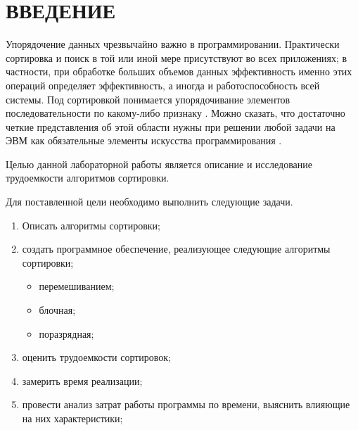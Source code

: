 \chapter*{\hfill{\centering  ВВЕДЕНИЕ}\hfill}


Упорядочение данных чрезвычайно важно в программировании. Практически сортировка и поиск в той или иной
мере присутствуют во всех приложениях; в частности, при обработке больших объемов данных эффективность именно этих операций определяет эффективность, а иногда и работоспособность всей системы.
Под сортировкой понимается упорядочивание элементов последовательности по какому-либо признаку \cite{book_shagbazyan}.
Можно сказать, что достаточно четкие представления об этой области нужны при решении любой задачи на ЭВМ как
обязательные элементы искусства программирования \cite{book_knut}.


Целью данной лабораторной работы является описание и исследование трудоемкости алгоритмов сортировки.

\label{sec:targets}
Для поставленной цели необходимо выполнить следующие задачи.
\begin{enumerate}
	\item Описать алгоритмы сортировки;
	\item создать программное обеспечение, реализующее следующие алгоритмы сортировки;
	\begin{itemize}
		\item перемешиванием;
		\item блочная;
		\item поразрядная;
	\end{itemize}
	\item оценить трудоемкости сортировок;
	\item замерить время реализации;
	\item провести анализ затрат работы программы по времени, выяснить влияющие на них характеристики;
\end{enumerate}




